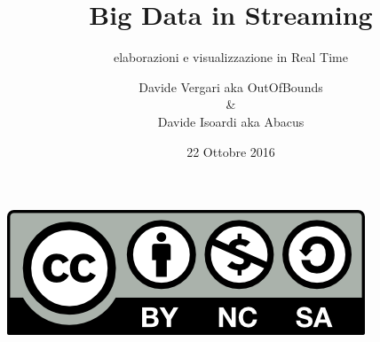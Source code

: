 \documentclass[10pt,xcolor=dvipsnames,flushleft]{beamer}
\title{Big Data in Streaming}
\subtitle{elaborazioni e visualizzazione in Real Time}
\author{Davide Vergari aka OutOfBounds \\ \& \\Davide Isoardi aka Abacus}
\date{22 Ottobre 2016}
\institute{Linux Day 2016}
\begin{document}


\begin{frame}
	\maketitle
	\begin{center}
		\includegraphics[scale=0.45]{img/cc-nc-sa}
	\end{center}

\end{frame}






\end{document}
